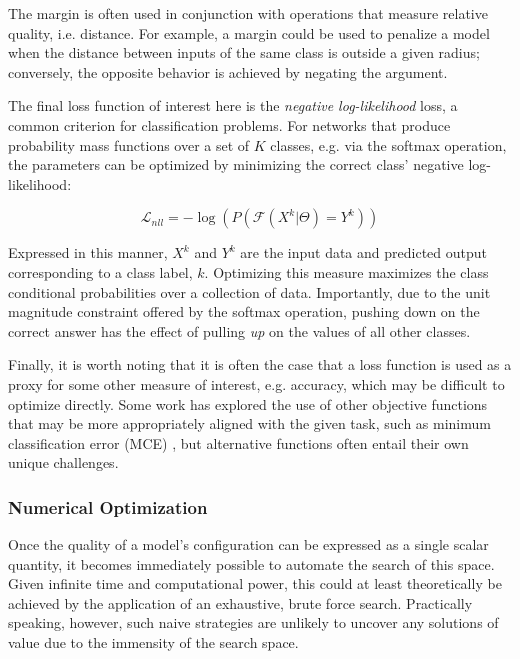 \noindent The margin is often used in conjunction with operations that measure relative quality, i.e. distance.
For example, a margin could be used to penalize a model when the distance between inputs of the same class is outside a given radius;
conversely, the opposite behavior is achieved by negating the argument.

The final loss function of interest here is the \emph{negative log-likelihood} loss, a common criterion for classification problems.
For networks that produce probability mass functions over a set of $K$ classes, e.g. via the softmax operation, the parameters can be optimized by minimizing the correct class' negative log-likelihood:

\begin{equation}
\label{eq:nll}
\mathcal{L}_{nll}=-\log(P(\mathcal{F}(X^k |\Theta) = Y^k))
\end{equation}

\noindent Expressed in this manner, $X^k$ and $Y^k$ are the input data and predicted output corresponding to a class label, $k$.
Optimizing this measure maximizes the class conditional probabilities over a collection of data.
Importantly, due to the unit magnitude constraint offered by the softmax operation, pushing down on the correct answer has the effect of pulling \emph{up} on the values of all other classes.

Finally, it is worth noting that it is often the case that a loss function is used as a proxy for some other measure of interest, e.g. accuracy, which may be difficult to optimize directly.
Some work has explored the use of other objective functions that may be more appropriately aligned with the given task, such as minimum classification error (MCE) \cite{Juang1997Minimum}, but alternative functions often entail their own unique challenges.


\subsubsection{Numerical Optimization}
\label{subsubsec:numopt}
Once the quality of a model's configuration can be expressed as a single scalar quantity, it becomes immediately possible to automate the search of this space.
Given infinite time and computational power, this could at least theoretically be achieved by the application of an exhaustive, brute force search.
Practically speaking, however, such naive strategies are unlikely to uncover any solutions of value due to the immensity of the search space.

